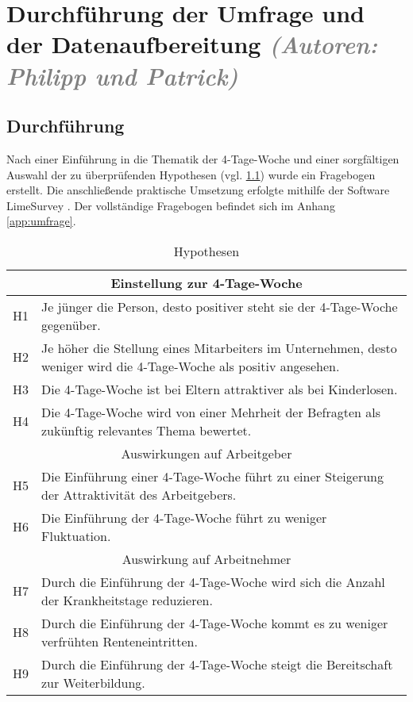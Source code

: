 \chapter{Durchführung der Umfrage und der Datenaufbereitung \textit{\textcolor{gray}{(Autoren: Philipp und Patrick)}}}


 
\section{Durchführung}

Nach einer Einführung in die Thematik der 4-Tage-Woche und einer sorgfältigen Auswahl der zu 
überprüfenden Hypothesen (vgl. \ref{tab:hyptothesen}) wurde ein Fragebogen erstellt.
Die anschließende praktische Umsetzung erfolgte mithilfe der Software LimeSurvey 
\parencite[vgl.][]{limesurvey_gmbh_limesurvey_nodate}. Der vollständige Fragebogen befindet sich im Anhang \ref{app:umfrage}.

\begin{table}
    \centering
      \begin{tabular}{|l|p{}|}
      \hline
      \multicolumn{2}{|c|}{Einstellung zur 4-Tage-Woche} \\ \hline
      H1 & Je jünger die Person, desto positiver steht sie der 4-Tage-Woche gegenüber. \\ \hline
      H2 & Je höher die Stellung eines Mitarbeiters im Unternehmen, desto weniger wird die 4-Tage-Woche als positiv angesehen. \\ \hline
      H3 & Die 4-Tage-Woche ist bei Eltern attraktiver als bei Kinderlosen. \\ \hline
      H4 & Die 4-Tage-Woche wird von einer Mehrheit der Befragten als zukünftig relevantes Thema bewertet. \\ \hline
      \multicolumn{2}{|c|}{Auswirkungen auf Arbeitgeber} \\ \hline
      H5 & Die Einführung einer 4-Tage-Woche führt zu einer Steigerung der Attraktivität des Arbeitgebers. \\ \hline
      H6 & Die Einführung der 4-Tage-Woche führt zu weniger Fluktuation. \\ \hline
      \multicolumn{2}{|c|}{Auswirkung auf Arbeitnehmer} \\ \hline
      H7 & Durch die Einführung der 4-Tage-Woche wird sich die Anzahl der Krankheitstage reduzieren. \\ \hline
      H8 & Durch die Einführung der 4-Tage-Woche kommt es zu weniger verfrühten Renteneintritten. \\ \hline
      H9 & Durch die Einführung der 4-Tage-Woche steigt die Bereitschaft zur Weiterbildung. \\ \hline
      \end{tabular}
      \caption{Hypothesen}
      \label{tab:hyptothesen}
\end{table}

